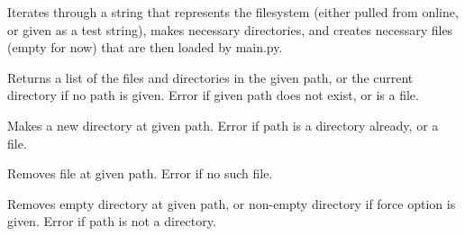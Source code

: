 \documentclass[letterpaper,12pt,openany,oneside]{sphinxmanual}
\begin{document}
\begin{fulllineitems}

\begin{fulllineitems}
\label{File_System:covertFS.File_System.covertfs.CovertFS.loadfs}
Iterates through a string that represents the filesystem
(either pulled from online, or given as a test string),
makes necessary directories, and creates necessary files
(empty for now) that are then loaded by main.py.

\end{fulllineitems}


\begin{fulllineitems}
\label{File_System:covertFS.File_System.covertfs.CovertFS.ls}
Returns a list of the files and directories in the given
path, or the current directory if no path is given.
Error if given path does not exist, or is a file.

\end{fulllineitems}


\begin{fulllineitems}
\label{File_System:covertFS.File_System.covertfs.CovertFS.mkdir}
Makes a new directory at given path.
Error if path is a directory already, or a file.

\end{fulllineitems}


\begin{fulllineitems}
\label{File_System:covertFS.File_System.covertfs.CovertFS.rm}
Removes file at given path.
Error if no such file.

\end{fulllineitems}


\begin{fulllineitems}
\label{File_System:covertFS.File_System.covertfs.CovertFS.rmdir}
Removes empty directory at given path, or non-empty
directory if force option is given.
Error if path is not a directory.


\end{fulllineitems}
\end{fulllineitems}
\end{document}
